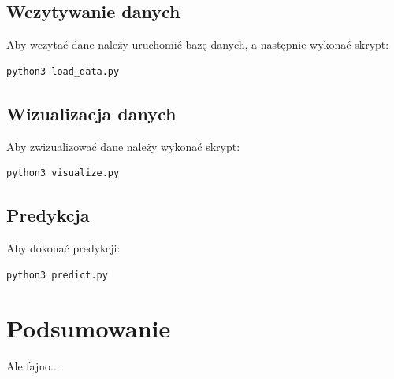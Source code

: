 \documentclass[a4paper,12pt]{mwart}
\begin{document}
\subsection{Wczytywanie danych}
Aby wczytać dane należy uruchomić bazę danych, a następnie wykonać skrypt:
\begin{lstlisting}
python3 load_data.py
\end{lstlisting}

\subsection{Wizualizacja danych}
Aby zwizualizować dane należy wykonać skrypt:
\begin{lstlisting}
python3 visualize.py
\end{lstlisting}

\subsection{Predykcja}
Aby dokonać predykcji:
\begin{lstlisting}
python3 predict.py
\end{lstlisting}

\section{Podsumowanie}
Ale fajno...
\end{document}
